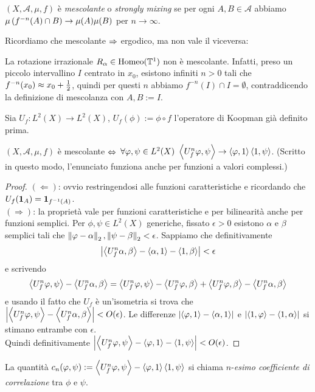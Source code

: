 \begin{defi}$(X,\mathcal{A},\mu,f)$ è \emph{mescolante} o \emph{strongly mixing} se
per ogni $A,B\in\mathcal{A}$ abbiamo $\mu\left(f^{-n}(A)\cap B\right)\to\mu(A)\mu(B)$ per $n\to\infty$.
\end{defi}

Ricordiamo che mescolante $\Rightarrow$ ergodico, ma non vale il viceversa:

\begin{esempio}La rotazione irrazionale $R_\alpha\in\operatorname{Homeo}(\mathbb{T}^1)$ non è mescolante.
Infatti, preso un piccolo intervallino $I$ centrato in $x_0$, esistono infiniti $n>0$ tali che $f^{-n}(x_0)\approx x_0+\frac{1}{2}$,
quindi per questi $n$ abbiamo $f^{-n}(I)\cap I=\emptyset$, contraddicendo la definizione di mescolanza con $A,B:=I$.
\end{esempio}

Sia $U_f:L^2(X)\to L^2(X)$, $U_f(\phi):=\phi\circ f$ l'operatore
di Koopman già definito prima.

\begin{prop}$(X,\mathcal{A},\mu,f)$ è mescolante $\Leftrightarrow$ $\forall\phi,\psi\in L^2(X)\ \ang{U_f^n\phi,\psi}\to\ang{\phi,1}\ang{1,\psi}$.
(Scritto in questo modo, l'enunciato funziona anche per funzioni a valori complessi.)
\end{prop}

\begin{proof}$(\Leftarrow)$: ovvio restringendosi alle funzioni caratteristiche e ricordando che $U_f(\bm{1}_A)=\bm{1}_{f^{-1}(A)}$. \\
$(\Rightarrow)$: la proprietà vale per funzioni caratteristiche e per bilinearità anche per funzioni semplici.
Per $\phi,\psi\in L^2(X)$ generiche, fissato $\epsilon>0$ esistono $\alpha$ e $\beta$ semplici tali che
$\left\|\varphi-\alpha\right\|_2,\left\|\psi-\beta\right\|_2<\epsilon$. Sappiamo che definitivamente
\[ \left|\left\langle U_f^n\alpha,\beta\right\rangle-\left\langle\alpha,1\right\rangle-\left\langle1,\beta\right\rangle\right|<\epsilon \]
e scrivendo
\[ \left\langle U_f^n\varphi,\psi\right\rangle-\left\langle U_f^n\alpha,\beta\right\rangle
=\left\langle U_f^n\varphi,\psi\right\rangle-\left\langle U_f^n\varphi,\beta\right\rangle+\left\langle U_f^n\varphi,\beta\right\rangle-\left\langle U_f^n\alpha,\beta\right\rangle \]
e usando il fatto che $U_f$ è un'isometria si trova che $\left|\left\langle U_f^n\varphi,\psi\right\rangle-\left\langle U_f^n\alpha,\beta\right\rangle\right|<O(\epsilon)$.
Le differenze $\left|\left\langle\varphi,1\right\rangle-\left\langle\alpha,1\right\rangle\right|$ e $\left|\left\langle1,\varphi\right\rangle-\left\langle1,\alpha\right\rangle\right|$ si stimano entrambe con $\epsilon$. \\
Quindi definitivamente $\left|\left\langle U_f^n\varphi,\psi\right\rangle-\left\langle\varphi,1\right\rangle-\left\langle1,\psi\right\rangle\right|<O(\epsilon)$.
\end{proof}

La quantità $c_n(\varphi,\psi):=\left\langle U_f^n\varphi,\psi\right\rangle-\left\langle\varphi,1\right\rangle\left\langle1,\psi\right\rangle$ si chiama $n$-\emph{esimo coefficiente di correlazione}
tra $\phi$ e $\psi$.

